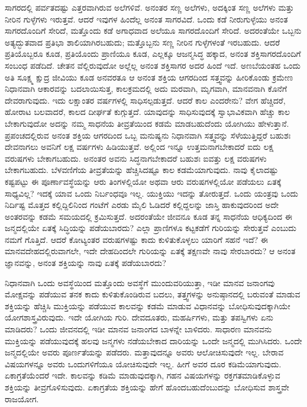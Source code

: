ಸಾಗರದಲ್ಲಿ ಪರ್ವತದಷ್ಟು ಎತ್ತರವಾಗಿರುವ ಅಲೆಗಳಿವೆ. ಅನಂತರ ಸಣ್ಣ ಅಲೆಗಳು, ಅದಕ್ಕಿಂತ ಸಣ್ಣ ಅಲೆಗಳು ಮತ್ತು ನೀರಿನ ಗುಳ್ಳೆಗಳು ಇರುತ್ತವೆ. ಆದರೆ ಇವುಗಳ ಹಿಂದೆಲ್ಲ ಅನಂತ ಸಾಗರವಿದೆ. ಒಂದು ಕಡೆ ನೀರುಗುಳ್ಳೆಯು ಅನಂತ ಸಾಗರದೊಂದಿಗೆ ಸೇರಿದೆ, ಮತ್ತೊಂದು ಕಡೆ ಅಗಾಧವಾದ ಅಲೆಯೂ ಸಾಗರದೊಂದಿಗೆ ಸೇರಿದೆ. ಅದರಂತೆಯೇ ಒಬ್ಬನು ಅತ್ಯದ್ಭುತವಾದ ಪ್ರತಿಭಾ ಶಾಲಿಯಾಗಿರಬಹುದು; ಮತ್ತೊಬ್ಬನು ಸಣ್ಣ ನೀರಿನ ಗುಳ್ಳೆಗಳಂತೆ ಇರಬಹುದು. ಆದರೆ ಪ್ರತಿಯೊಬ್ಬರೂ ಕೂಡ, ಪ್ರತಿಯೊಂದು ಪ್ರಾಣಿಯೂ ಕೂಡ, ಎಲ್ಲಕ್ಕೂ ಆಜನ್ಮಸಿದ್ಧ ಹಕ್ಕಾದ, ಅನಂತ ಶಕ್ತಿಸಾಗರದೊಂದಿಗೆ ಸಂಬಂಧ ಪಡೆದಿದೆ. ಚೇತನ ವೆಲ್ಲಿರುವುದೋ ಅಲ್ಲೆಲ್ಲ ಅನಂತ ಶಕ್ತಿಸಾಗರ ಅದರ ಹಿಂದೆ ಇದೆ. ಅಣಬೆಯಂತಹ ಒಂದು ಅತಿ ಸೂಕ್ಷ್ಮ ಕ್ಷುದ್ರ ಜೀವಿಯು ಕೂಡ ಅನವರತೂ ಆ ಅನಂತ ಶಕ್ತಿಯ ಆಗರದಿಂದ ಸತ್ತ್ವವನ್ನು ಹೀರಿಕೊಂಡು ಕ್ರಮೇಣ ನಿಧಾನವಾಗಿ ಆಕಾರವನ್ನು ಬದಲಾಯಿಸುತ್ತ, ಕಾಲಕ್ರಮದಲ್ಲಿ ಅದು ಮರವಾಗಿ, ಮೃಗವಾಗಿ, ಮಾನವನಾಗಿ ಕೊನೆಗೆ ದೇವರಾಗುವುದು. ಇದು ಲಕ್ಷಾಂತರ ವರ್ಷಗಳಲ್ಲಿ ಸಾಧಿಸಲ್ಪಡುತ್ತದೆ. ಆದರೆ ಕಾಲ ಎಂದರೇನು? ವೇಗ ಹೆಚ್ಚಿದರೆ, ಹೋರಾಟ ಬಲವಾದರೆ, ಕಾಲದ ದೀರ್ಘತೆ ಕುಗ್ಗುತ್ತದೆ. ಯಾವುದನ್ನು ಸಾಧಿಸುವುದಕ್ಕೆ ಸ್ವಾಭಾವಿಕವಾಗಿ ಹೆಚ್ಚು ಕಾಲ ಬೇಕಾಗುವುದೋ ಅದನ್ನು ನಮ್ಮ ಸಾಧನೆಯ ತೀವ್ರತೆಯಿಂದ ಕಡಮೆ ಮಾಡಬಹುದೆಂದು ಯೋಗಿಯು ಹೇಳುತ್ತಾನೆ. ಪ್ರಪಂಚದಲ್ಲಿರುವ ಅನಂತ ಶಕ್ತಿಯ ಆಗರದಿಂದ ಒಬ್ಬ ಮನುಷ್ಯನು ನಿಧಾನವಾಗಿ ಸತ್ತ್ವವನ್ನು ಸೆಳೆಯುತ್ತಿದ್ದರೆ ಬಹುಶಃ ದೇವನಾಗಲು ಅವನಿಗೆ ಲಕ್ಷ ವರ್ಷಗಳು ಹಿಡಿಯುತ್ತವೆ. ಅಲ್ಲಿಂದ ಇನ್ನೂ ಉತ್ತಮನಾಗಬೇಕಾದರೆ ಐದು ಲಕ್ಷ ವರುಷಗಳು ಬೇಕಾಗಬಹುದು. ಅನಂತರ ಅವನು ಸಿದ್ಧನಾಗಬೇಕಾದರೆ ಬಹುಶಃ ಐವತ್ತು ಲಕ್ಷ ವರುಷಗಳು ಬೇಕಾಗಬಹುದು. ಬೆಳವಣಿಗೆಯ ತೀವ್ರತೆಯನ್ನು ಹೆಚ್ಚಿಸಿದಷ್ಟೂ ಕಾಲ ಕಡಮೆಯಾಗುವುದು. ನಾವು ಕೈಲಾದಷ್ಟು ಕಷ್ಟಪಟ್ಟು ಈ ಪೂರ್ಣಾವಸ್ಥೆಯನ್ನು ಆರು ತಿಂಗಳಲ್ಲಿಯೋ ಅಥವಾ ಆರು ವರುಷಗಳಲ್ಲಿಯೋ ಪಡೆಯಲು ಏತಕ್ಕೆ ಸಾಧ್ಯವಿಲ್ಲ? ಇದಕ್ಕೆ ಯಾವ ಒಂದು ನಿರ್ಬಂಧವೂ ಇಲ್ಲ. ಯುಕ್ತಿಯು ಇದನ್ನು ತೋರುತ್ತದೆ. ಒಂದು ಯಂತ್ರವು ಒಂದು ನಿರ್ದಿಷ್ಟ ಮೊತ್ತದ ಕಲ್ಲಿದ್ದಿಲಿನಿಂದ ಗಂಟೆಗೆ ಎರಡು ಮೈಲಿ ಓಡಿದರೆ ಕಲ್ಲಿದ್ದಲನ್ನು ಜಾಸ್ತಿ ಹಾಕುವುದರಿಂದ ಅದೇ ಅಂತರವನ್ನು ಕಡಮೆ ಸಮಯದಲ್ಲಿ ಕ್ರಮಿಸುತ್ತದೆ. ಅದರಂತೆಯೇ ಜೀವನೂ ಕೂಡ ತನ್ನ ಸಾಧನೆಯ ಆಧಿಕ್ಯದಿಂದ ಈ ಜನ್ಮದಲ್ಲಿಯೇ ಏತಕ್ಕೆ ಸಿದ್ಧಿಯನ್ನು ಪಡೆಯಬಾರದು? ಎಲ್ಲಾ ಪ್ರಾಣಿಗಳೂ ಕಟ್ಟಕಡೆಗೆ ಗುರಿಯನ್ನು ಸೇರುತ್ತವೆ ಎಂಬುದು ನಮಗೆ ಗೊತ್ತಿದೆ. ಆದರೆ ಕೋಟ್ಯಂತರ ವರುಷಗಳಷ್ಟು ಕಾದು ಕುಳಿತುಕೊಳ್ಳಲು ಯಾರಿಗೆ ಸಹನೆ ಇದೆ? ಈ ಮಾನವದೇಹದಲ್ಲಿರುವಾಗಲೇ, ಇದೇ ದೇಹದಿಂದಲೇ ಗುರಿಯನ್ನು ಏತಕ್ಕೆ ತಕ್ಷಣವೇ ನಾವು ಸೇರಬಾರದು? ಆ ಅನಂತ ಜ್ಞಾನವನ್ನು, ಅನಂತ ಶಕ್ತಿಯನ್ನು ನಾವು ಏತಕ್ಕೆ ಪಡೆಯಬಾರದು?

ನಿಧಾನವಾಗಿ ಒಂದು ಅವಸ್ಥೆಯಿಂದ ಮತ್ತೊಂದು ಅವಸ್ಥೆಗೆ ಮುಂದುವರಿಯುತ್ತಾ, ಇಡೀ ಮಾನವ ಜನಾಂಗವು ಮೋಕ್ಷವನ್ನು ಪಡೆಯುವ ತನಕ ಕಾದು ಕುಳಿತುಕೊಂಡಿರುವ ಬದಲು, ತತ್ತ್ವಗಳನ್ನು ಅನುಷ್ಠಾನದಲ್ಲಿ ಬರುವಂತೆ ಮಾಡುವ ಶಕ್ತಿಯನ್ನು ಹೆಚ್ಚಿಸಿ ಮುಕ್ತಿಯನ್ನು ಪಡೆಯುವ ಕಾಲವನ್ನು ಕಡಮೆ ಮಾಡುವ ವಿಧಾನವನ್ನು ಬೋಧಿಸುವುದಕ್ಕಾಗಿಯೇ ಯೋಗಶಾಸ್ತ್ರವಿರುವುದು. ಇದೇ ಯೋಗಿಯ ಗುರಿ. ದೇವದೂತರು, ಮಹರ್ಷಿಗಳು, ಮತ್ತು ತಪಸ್ವಿಗಳು ಏನು ಮಾಡಿದರು? ಒಂದು ಜೀವನದಲ್ಲಿ ಇಡೀ ಮಾನವ ಜನಾಂಗದ ಬಾಳನ್ನೇ ಬಾಳಿದರು. ಸಾಧಾರಣ ಮಾನವನು ಮುಕ್ತಿಯನ್ನು ಪಡೆಯುವುದಕ್ಕೆ ಹಲವು ಜನ್ಮಗಳು ನಡೆಯಬೇಕಾದ ದಾರಿಯನ್ನು ಒಂದೇ ಜನ್ಮದಲ್ಲಿ ಮುಗಿಸಿದರು. ಒಂದೇ ಜನ್ಮದಲ್ಲಿಯೇ ಅವರು ಪೂರ್ಣತೆಯನ್ನು ಪಡೆದರು. ಮತ್ತಾವುದನ್ನೂ ಅವರು ಆಲೋಚಿಸುವುದೇ ಇಲ್ಲ. ಬೇರಾವ ವಿಷಯಗಳನ್ನೂ ಅವರು ಒಂದು\break ಗಳಿಗೆಯೂ ಯೋಚಿಸುವುದೇ ಇಲ್ಲ. ಹೀಗೆ ಅವರ ದೂರ ಕಡಿಮೆಯಾಗುವುದು. ಏಕಾಗ್ರತೆಯೆಂದರೆ ಇದೇ. ಕಾಲವನ್ನು ಕಡಿಮೆ ಮಾಡುವುದಕ್ಕಾಗಿ, ಗಹನ ವಿಷಯಗಳನ್ನು ರಕ್ತಗತಮಾಡಿಕೊಳ್ಳುವ ಶಕ್ತಿಯನ್ನು ತೀವ್ರಗೊಳಿಸುವುದು. ಏಕಾಗ್ರತೆಯ ಶಕ್ತಿಯನ್ನು ಹೇಗೆ ಹೊಂದಬಹುದೆಂಬುದನ್ನು ಬೋಧಿಸುವ ಶಾಸ್ತ್ರವೇ ರಾಜಯೋಗ. 

